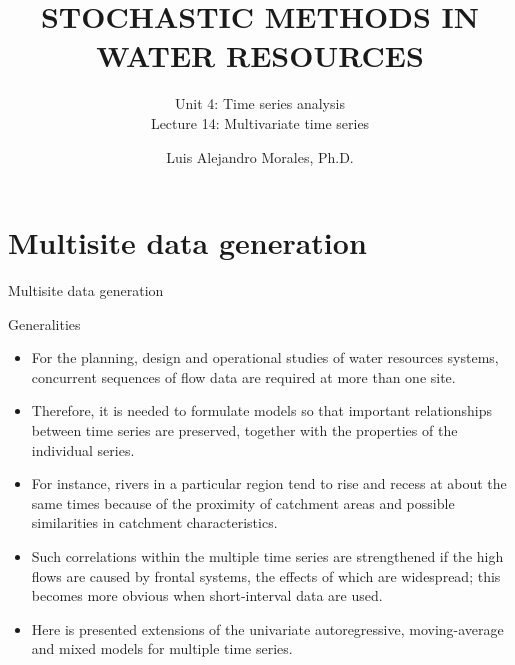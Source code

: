 \documentclass[8pt]{beamer}
\title{STOCHASTIC METHODS IN WATER RESOURCES}
\subtitle{Unit 4: Time series analysis \\ Lecture 14: Multivariate time series}
\author{Luis Alejandro Morales, Ph.D.}
\institute{Universidad Nacional de Colombia \\ Department of Civil and Agriculture Engineering} %
\renewcommand{\emph}[1]{\textcolor{myorange}{#1}}
\begin{document}
\begin{frame}
    \titlepage
\end{frame}

\section{Multisite data generation}
\begin{frame}{Multisite data generation}
    \begin{block}{Generalities}
    \end{block}
    \begin{itemize}
        \item For the \emph{planning}, \emph{design} and \emph{operational} studies  of water resources systems, concurrent sequences of flow data are required at more than one site. 
        \item Therefore, it is  needed to formulate models  so that important relationships between time series are preserved, together with the properties of the individual series. 
        \item For instance, rivers in a particular region tend to \emph{rise} and \emph{recess} at about the same times because of the proximity of catchment areas and possible similarities in catchment characteristics. 
        \item Such correlations within the multiple time series are strengthened if the high flows are caused by frontal systems, the effects of which are widespread; this becomes more obvious when short-interval data are used.  
        \item Here is presented extensions of the univariate \emph{autoregressive}, \emph{moving-average} and \emph{mixed} models for \emph{multiple time series}.
    \end{itemize}
\end{frame}
\end{document}
